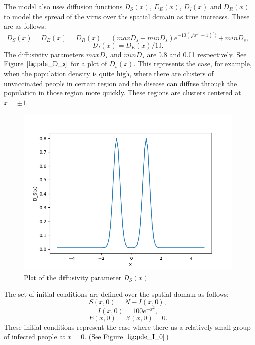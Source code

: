 \documentclass{article}
\begin{document}
The model also uses diffusion functions $D_S(x)$, $D_E(x)$, $D_I(x)$ and $D_R(x)$ to model the spread of the virus over the spatial domain as time increases. These are as follows:
\begin{equation}
D_S(x) = D_E(x) = D_R(x) = (maxD_s - minD_s)e^{-10(\sqrt{x^{2}} - 1)^2)} + minD_s,
\end{equation} 
\begin{equation}
D_I(x) = D_E(x)/10.
\end{equation}
The diffusivity parameters $maxD_s$ and $minD_s$ are 0.8 and 0.01 respectively. See Figure $\ref{fig:pde_D_s}$ for a plot of $D_s(x)$. This represents the case, for example, when the population density is quite high, where there are clusters of unvaccinated people in certain region and the disease can diffuse through the population in those region more quickly. These regions are clusters centered at $x= \pm 1$.

\begin{figure}[H]
\centering
\includegraphics[width=0.7\linewidth]{./figures/pde_D_s}
\caption{Plot of the diffusivity parameter $D_S(x)$}
\label{fig:pde_D_s}
\end{figure}

The set of initial conditions are defined over the spatial domain as follows:
\begin{equation}
S(x, 0) = N - I(x, 0),
\end{equation}
\begin{equation}
I(x, 0) = 100e^{-x^2},
\end{equation}
\begin{equation}
E(x, 0) = R(x, 0) = 0.
\end{equation}
These initial conditions represent the case where there us a relatively small group of infected people at $x=0$. (See Figure $\ref{fig:pde_I_0}$)
\end{document}
